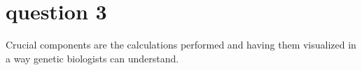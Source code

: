 \section{question 3}
Crucial components are the calculations performed and having them visualized in a way genetic biologists can understand.